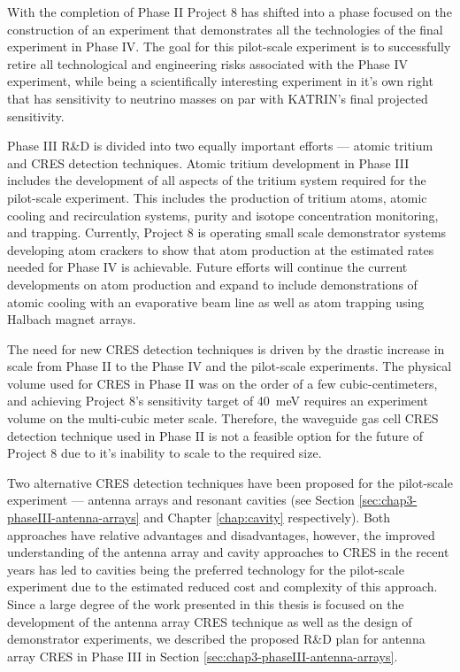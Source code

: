 With the completion of Phase II Project 8 has shifted into a phase focused on the construction of an experiment that demonstrates all the technologies of the final experiment in Phase IV. The goal for this pilot-scale experiment is to successfully retire all technological and engineering risks associated with the Phase IV experiment, while being a scientifically interesting experiment in it's own right that has sensitivity to neutrino masses on par with KATRIN's final projected sensitivity. 

Phase III R\&D is divided into two equally important efforts --- atomic tritium and CRES detection techniques. Atomic tritium development in Phase III includes the development of all aspects of the tritium system required for the pilot-scale experiment. This includes the production of tritium atoms, atomic cooling and recirculation systems, purity and isotope concentration monitoring, and trapping. Currently, Project 8 is operating small scale demonstrator systems developing atom crackers to show that atom production at the estimated rates needed for Phase IV is achievable. Future efforts will continue the current developments on atom production and expand to include demonstrations of atomic cooling with an evaporative beam line as well as atom trapping using Halbach magnet arrays.

The need for new CRES detection techniques is driven by the drastic increase in scale from Phase II to the Phase IV and the pilot-scale experiments. The physical volume used for CRES in Phase II was on the order of a few cubic-centimeters, and achieving Project 8's sensitivity target of 40~meV requires an experiment volume on the multi-cubic meter scale. Therefore, the waveguide gas cell CRES detection technique used in Phase II is not a feasible option for the future of Project 8 due to it's inability to scale to the required size.

Two alternative CRES detection techniques have been proposed for the pilot-scale experiment --- antenna arrays and resonant cavities (see Section \ref{sec:chap3-phaseIII-antenna-arrays} and Chapter \ref{chap:cavity} respectively). Both approaches have relative advantages and disadvantages, however, the improved understanding of the antenna array and cavity approaches to CRES in the recent years has led to cavities being the preferred technology for the pilot-scale experiment due to the estimated reduced cost and complexity of this approach. Since a large degree of the work presented in this thesis is focused on the development of the antenna array CRES technique as well as the design of demonstrator experiments, we described the proposed R\&D plan for antenna array CRES in Phase III in Section \ref{sec:chap3-phaseIII-antenna-arrays}. 

